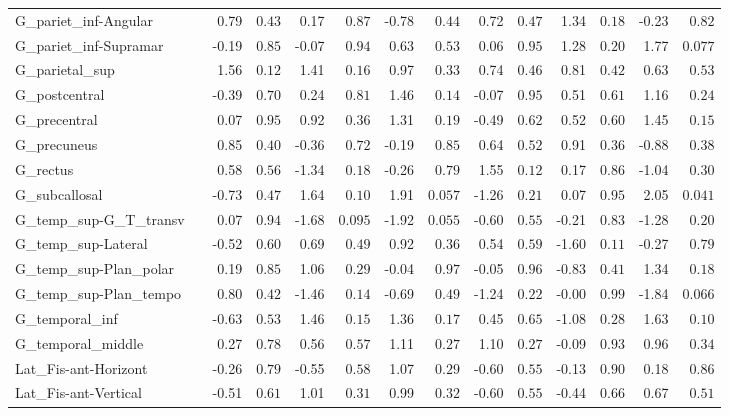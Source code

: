 {\begin{longtable}{llrrrrrrrrrrrr}
G\_pariet\_inf-Angular &  & 0.79 & $0.43$ & 0.17 & $0.87$ & -0.78 & $0.44$ & 0.72 & $0.47$ & 1.34 & $0.18$ & -0.23 & $0.82$ \\
G\_pariet\_inf-Supramar &  & -0.19 & $0.85$ & -0.07 & $0.94$ & 0.63 & $0.53$ & 0.06 & $0.95$ & 1.28 & $0.20$ & 1.77 & $0.077$ \\
G\_parietal\_sup &  & 1.56 & $0.12$ & 1.41 & $0.16$ & 0.97 & $0.33$ & 0.74 & $0.46$ & 0.81 & $0.42$ & 0.63 & $0.53$ \\
G\_postcentral &  & -0.39 & $0.70$ & 0.24 & $0.81$ & 1.46 & $0.14$ & -0.07 & $0.95$ & 0.51 & $0.61$ & 1.16 & $0.24$ \\
G\_precentral &  & 0.07 & $0.95$ & 0.92 & $0.36$ & 1.31 & $0.19$ & -0.49 & $0.62$ & 0.52 & $0.60$ & 1.45 & $0.15$ \\
G\_precuneus &  & 0.85 & $0.40$ & -0.36 & $0.72$ & -0.19 & $0.85$ & 0.64 & $0.52$ & 0.91 & $0.36$ & -0.88 & $0.38$ \\
G\_rectus &  & 0.58 & $0.56$ & -1.34 & $0.18$ & -0.26 & $0.79$ & 1.55 & $0.12$ & 0.17 & $0.86$ & -1.04 & $0.30$ \\
G\_subcallosal &  & -0.73 & $0.47$ & 1.64 & $0.10$ & 1.91 & $0.057$ & -1.26 & $0.21$ & 0.07 & $0.95$ & 2.05 & $0.041$ \\
G\_temp\_sup-G\_T\_transv &  & 0.07 & $0.94$ & -1.68 & $0.095$ & -1.92 & $0.055$ & -0.60 & $0.55$ & -0.21 & $0.83$ & -1.28 & $0.20$ \\
G\_temp\_sup-Lateral &  & -0.52 & $0.60$ & 0.69 & $0.49$ & 0.92 & $0.36$ & 0.54 & $0.59$ & -1.60 & $0.11$ & -0.27 & $0.79$ \\
G\_temp\_sup-Plan\_polar &  & 0.19 & $0.85$ & 1.06 & $0.29$ & -0.04 & $0.97$ & -0.05 & $0.96$ & -0.83 & $0.41$ & 1.34 & $0.18$ \\
G\_temp\_sup-Plan\_tempo &  & 0.80 & $0.42$ & -1.46 & $0.14$ & -0.69 & $0.49$ & -1.24 & $0.22$ & -0.00 & $0.99$ & -1.84 & $0.066$ \\
G\_temporal\_inf &  & -0.63 & $0.53$ & 1.46 & $0.15$ & 1.36 & $0.17$ & 0.45 & $0.65$ & -1.08 & $0.28$ & 1.63 & $0.10$ \\
G\_temporal\_middle &  & 0.27 & $0.78$ & 0.56 & $0.57$ & 1.11 & $0.27$ & 1.10 & $0.27$ & -0.09 & $0.93$ & 0.96 & $0.34$ \\
Lat\_Fis-ant-Horizont &  & -0.26 & $0.79$ & -0.55 & $0.58$ & 1.07 & $0.29$ & -0.60 & $0.55$ & -0.13 & $0.90$ & 0.18 & $0.86$ \\
Lat\_Fis-ant-Vertical &  & -0.51 & $0.61$ & 1.01 & $0.31$ & 0.99 & $0.32$ & -0.60 & $0.55$ & -0.44 & $0.66$ & 0.67 & $0.51$ \\

\end{longtable}}
